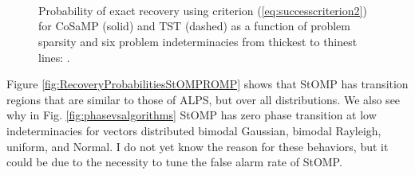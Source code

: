 \documentclass[11pt,draftcls,onecolumn]{IEEEtran}
\begin{document}
\begin{figure}[htb]
\centering
{}\hspace{-0.1in}
\\ \vspace{-0.1in}

\hspace{-0.1in}
\\ \vspace{-0.1in}

\hspace{-0.1in}
\\ \vspace{-0.1in}

\caption{Probability of exact recovery using criterion (\ref{eq:successcriterion2}) 
for CoSaMP (solid) and TST (dashed) as a function of problem sparsity
and six problem indeterminacies from thickest to thinest lines: 
.}
\label{fig:RecoveryProbabilitiesIHTALPS}
\end{figure}

\clearpage 

Figure \ref{fig:RecoveryProbabilitiesStOMPROMP}
shows that StOMP has transition regions that are
similar to those of ALPS, but over all distributions. 
We also see why in Fig. \ref{fig:phasevsalgorithms} StOMP has zero phase transition
at low indeterminacies for vectors distributed bimodal Gaussian, 
bimodal Rayleigh, uniform, and Normal.
I do not yet know the reason for these behaviors,
but it could be due to the necessity to tune
the false alarm rate of StOMP.
\end{document}
